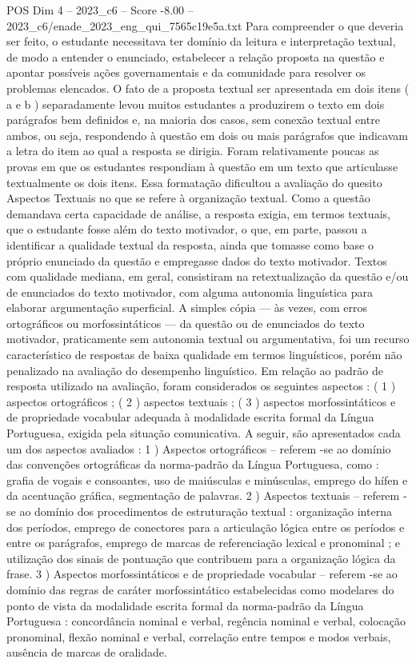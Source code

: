 \begin{textsample}{POS Dim 4 – 2023\_c6 – Score -8.00 – 2023\_c6/enade\_2023\_eng\_qui\_7565c19e5a.txt}
Para compreender o que deveria ser feito, o estudante necessitava ter domínio da leitura e interpretação textual, de modo a entender o enunciado, estabelecer a relação proposta na questão e apontar possíveis ações governamentais e da comunidade para resolver os problemas elencados.
O fato de a proposta textual ser apresentada em dois itens ( a e b ) separadamente levou muitos estudantes a produzirem o texto em dois parágrafos bem definidos e, na maioria dos casos, sem conexão textual entre ambos, ou seja, respondendo à questão em dois ou mais parágrafos que indicavam a letra do item ao qual a resposta se dirigia.
Foram relativamente poucas as provas em que os estudantes respondiam à questão em um texto que articulasse textualmente os dois itens.
Essa formatação dificultou a avaliação do quesito Aspectos Textuais no que se refere à organização textual.
Como a questão demandava certa capacidade de análise, a resposta exigia, em termos textuais, que o estudante fosse além do texto motivador, o que, em parte, passou a identificar a qualidade textual da resposta, ainda que tomasse como base o próprio enunciado da questão e empregasse dados do texto motivador.
Textos com qualidade mediana, em geral, consistiram na retextualização da questão e/ou de enunciados do texto motivador, com alguma autonomia linguística para elaborar argumentação superficial.
A simples cópia — às vezes, com erros ortográficos ou morfossintáticos — da questão ou de enunciados do texto motivador, praticamente sem autonomia textual ou argumentativa, foi um recurso característico de respostas de baixa qualidade em termos linguísticos, porém não penalizado na avaliação do desempenho linguístico.
Em relação ao padrão de resposta utilizado na avaliação, foram considerados os seguintes aspectos : ( 1 ) aspectos ortográficos ; ( 2 ) aspectos textuais ; ( 3 ) aspectos morfossintáticos e de propriedade vocabular adequada à modalidade escrita formal da Língua Portuguesa, exigida pela situação comunicativa.
A seguir, são apresentados cada um dos aspectos avaliados : 1 ) Aspectos ortográficos – referem -se ao domínio das convenções ortográficas da norma-padrão da Língua Portuguesa, como : grafia de vogais e consoantes, uso de maiúsculas e minúsculas, emprego do hífen e da acentuação gráfica, segmentação de palavras. 2 ) Aspectos textuais – referem -se ao domínio dos procedimentos de estruturação textual : organização interna dos períodos, emprego de conectores para a articulação lógica entre os períodos e entre os parágrafos, emprego de marcas de referenciação lexical e pronominal ; e utilização dos sinais de pontuação que contribuem para a organização lógica da frase. 3 ) Aspectos morfossintáticos e de propriedade vocabular – referem -se ao domínio das regras de caráter morfossintático estabelecidas como modelares do ponto de vista da modalidade escrita formal da norma-padrão da Língua Portuguesa : concordância nominal e verbal, regência nominal e verbal, colocação pronominal, flexão nominal e verbal, correlação entre tempos e modos verbais, ausência de marcas de oralidade.

\end{textsample}
